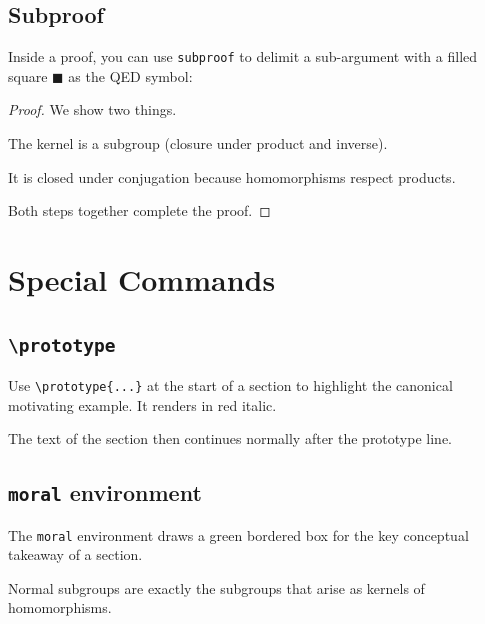 \documentclass[11pt]{scrartcl}
\begin{document}
\subsection{Subproof}

Inside a proof, you can use \texttt{subproof} to delimit a sub-argument
with a filled square $\blacksquare$ as the QED symbol:

\begin{proof}
    We show two things.

    \begin{subproof}[Step 1]
        The kernel is a subgroup (closure under product and inverse).
    \end{subproof}

    \begin{subproof}[Step 2]
        It is closed under conjugation because homomorphisms respect products.
    \end{subproof}

    Both steps together complete the proof.
\end{proof}

\section{Special Commands}

\subsection{\texttt{\textbackslash prototype}}

Use \verb|\prototype{...}| at the start of a section to highlight the
canonical motivating example. It renders in red italic.


The text of the section then continues normally after the prototype line.

\subsection{\texttt{moral} environment}

The \texttt{moral} environment draws a green bordered box for the key
conceptual takeaway of a section.

\begin{moral}
    Normal subgroups are exactly the subgroups that arise as kernels
    of homomorphisms.
\end{moral}
\end{document}
